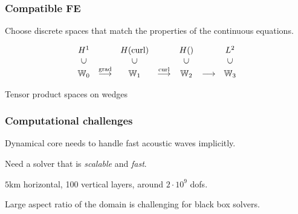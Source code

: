 \documentclass[presentation]{beamer}
\newcommand{\W}{\ensuremath{\mathbb{W}}}
\DeclareMathOperator{\grad}{grad}
\let\div\relax
\DeclareMathOperator{\div}{div}
\DeclareMathOperator{\curl}{curl}
\newcommand{\vsubset}[1]{\rotatebox[origin=c]{90}{\ensuremath{\subset}}}
\begin{document}
\begin{frame}
  \frametitle{Compatible FE}
  Choose discrete spaces that match the properties of the
  continuous equations.

  \begin{equation*}
    \begin{matrix}
      H^1 & & H(\curl) & & H(\div) & & L^2\\
      \vsubset{} & & \vsubset{} & & \vsubset{} & & \vsubset{} \\
      \W_0 & \stackrel{\grad}{\longrightarrow} &
      \W_1 & \stackrel{\curl}{\longrightarrow} &
      \W_2 & \stackrel{\div}{\longrightarrow} &
      \W_3
    \end{matrix}
  \end{equation*}

  \begin{block}{Tensor product spaces on wedges}
    \begin{center}
    \end{center}
  \end{block}
\end{frame}

\begin{frame}
  \frametitle{Computational challenges}
  Dynamical core needs to handle fast acoustic waves
  implicitly.

  Need a solver that is \emph{scalable} and \emph{fast}.

  $5$km horizontal, 100 vertical layers, around $2 \cdot 10^9$ dofs.

  Large aspect ratio of the domain is challenging for black box
  solvers.
\end{frame}
\end{document}
